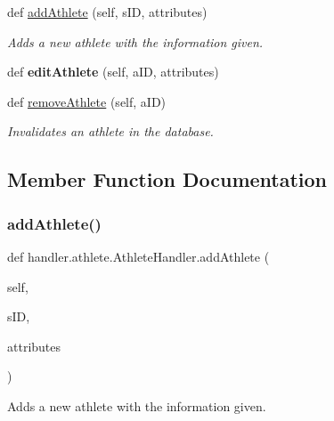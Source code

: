 \begin{DoxyCompactItemize}
\item 
def \hyperlink{classhandler_1_1athlete_1_1_athlete_handler_a08fe0c2dab373f26b69dbab68a1b2a72}{add\+Athlete} (self, s\+ID, attributes)
\begin{DoxyCompactList}\small\item\em Adds a new athlete with the information given. \end{DoxyCompactList}\item 
\mbox{\label{classhandler_1_1athlete_1_1_athlete_handler_af2953ad06fe27a2bd718a83cde63272b}} 
def {\bfseries edit\+Athlete} (self, a\+ID, attributes)
\item 
def \hyperlink{classhandler_1_1athlete_1_1_athlete_handler_a9f3ea8fb6c3c156f89c2b2a5bda6e689}{remove\+Athlete} (self, a\+ID)
\begin{DoxyCompactList}\small\item\em Invalidates an athlete in the database. \end{DoxyCompactList}\end{DoxyCompactItemize}


\subsection{Member Function Documentation}
\mbox{\label{classhandler_1_1athlete_1_1_athlete_handler_a08fe0c2dab373f26b69dbab68a1b2a72}} 
\subsubsection{\texorpdfstring{add\+Athlete()}{addAthlete()}}
{\footnotesize\ttfamily def handler.\+athlete.\+Athlete\+Handler.\+add\+Athlete (\begin{DoxyParamCaption}\item[{}]{self,  }\item[{}]{s\+ID,  }\item[{}]{attributes }\end{DoxyParamCaption})}



Adds a new athlete with the information given. 


